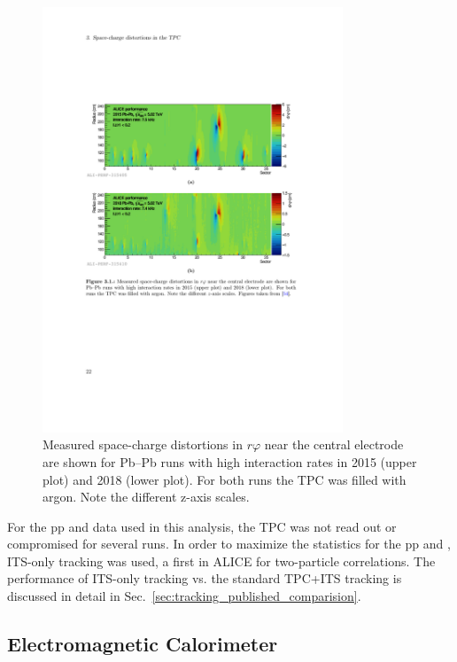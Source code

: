 \begin{figure}[htpb]
  \centering
  \includegraphics[width=0.8\textwidth]{Experimental_Aparatus/TPC_distortion.pdf}
  \caption{Measured space-charge distortions in $r\varphi$ near the central electrode are shown for Pb–Pb runs with high interaction rates in 2015 (upper plot) and 2018 (lower plot). For both runs the TPC was filled with argon. Note the different z-axis scales. \cite{Hellbar2019}}
  \label{fig:tpc_distortion}
\end{figure}


For the pp and \pPb data used in this analysis, the TPC was not read out or compromised for several runs. In order to maximize the statistics for the pp and \pPb, ITS-only tracking was used, a first in ALICE for two-particle correlations. The performance of ITS-only tracking vs. the standard TPC+ITS tracking is discussed in detail in Sec.~\ref{sec:tracking_published_comparision}.

\FloatBarrier
\subsection{Electromagnetic Calorimeter}
\label{sec:EMCal}

